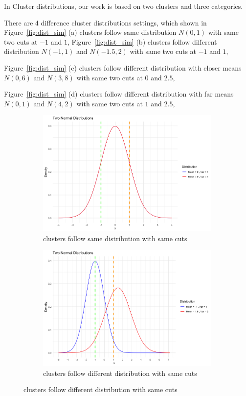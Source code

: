 \documentclass{article}
\begin{document}
In Cluster distributions, our work is based on two clusters and three categories.

There are 4 difference cluster distributions settings, which shown in 
Figure~\ref*{fig:dist_sim} (a) clusters follow same distribution $N(0, 1)$ 
with same two cuts at $-1$ and $1$,
Figure~\ref*{fig:dist_sim} (b) clusters follow different distribution $N(-1,1)$ and $N(-1.5,2)$
with same two cuts at $-1$ and $1$,

Figure~\ref*{fig:dist_sim} (c) clusters follow different distribution with closer means $N(0,6)$ and $N(3,8)$
with same two cuts at $0$ and $2.5$,

Figure~\ref*{fig:dist_sim} (d) clusters follow different distribution with far means $N(0,1)$ and $N(4,2)$
with same two cuts at $1$ and $2.5$,

\begin{figure}[h]
  \centering
  \begin{subfigure}{0.49\textwidth}
      \centering
      \includegraphics[width=\textwidth]{images/dist_simu/4-0_1.png}
      \caption{clusters follow same distribution with same cuts}
  \end{subfigure}
  \hfill
  \begin{subfigure}{0.49\textwidth}
      \centering
      \includegraphics[width=\textwidth]{images/dist_simu/3--1_1_15_2.png} %
      \caption{clusters follow different distribution with same cuts}
  \end{subfigure}


\end{figure}
\end{document}
